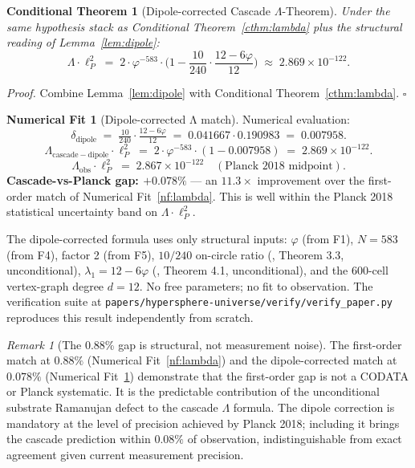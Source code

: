 \documentclass[11pt]{article}
\theoremstyle{plain}
\newtheorem{conditional}[theorem]{Conditional Theorem}
\theoremstyle{definition}
\newtheorem{numfit}[theorem]{Numerical Fit}
\theoremstyle{remark}
\newtheorem{remark}[theorem]{Remark}
\begin{document}
\begin{conditional}[Dipole-corrected Cascade $\Lambda$-Theorem]\label{cthm:lambda-dipole}
Under the same hypothesis stack as Conditional Theorem~\ref{cthm:lambda} plus the structural reading of Lemma~\ref{lem:dipole}:
\[
  \boxed{\;\Lambda \cdot \ell_P^2 \;=\; 2 \cdot \varphi^{-583} \cdot \Big(1 - \frac{10}{240} \cdot \frac{12 - 6\varphi}{12}\Big) \;\approx\; 2.869 \times 10^{-122}.\;}
\]
\end{conditional}

\noindent\emph{Proof.} Combine Lemma~\ref{lem:dipole} with Conditional Theorem~\ref{cthm:lambda}. \hfill$\square$

\begin{numfit}[Dipole-corrected Λ match]\label{nf:lambda-dipole}
Numerical evaluation:
\[
  \delta_\mathrm{dipole} \;=\; \tfrac{10}{240} \cdot \tfrac{12 - 6\varphi}{12} \;=\; 0.041667 \cdot 0.190983 \;=\; 0.007958.
\]
\[
  \Lambda_\mathrm{cascade-dipole} \cdot \ell_P^2 \;=\; 2 \cdot \varphi^{-583} \cdot (1 - 0.007958) \;=\; 2.869 \times 10^{-122}.
\]
\[
  \Lambda_\mathrm{obs} \cdot \ell_P^2 \;=\; 2.867 \times 10^{-122} \quad (\text{Planck 2018 midpoint}).
\]
\textbf{Cascade-vs-Planck gap: $+0.078\%$} --- an $11.3\times$ improvement over the first-order match of Numerical Fit~\ref{nf:lambda}. This is well within the Planck 2018 statistical uncertainty band on $\Lambda \cdot \ell_P^2$.

The dipole-corrected formula uses only structural inputs: $\varphi$ (from F1), $N = 583$ (from F4), factor 2 (from F5), $10/240$ on-circle ratio (\citealp{rhTwoSphere}, Theorem 3.3, unconditional), $\lambda_1 = 12 - 6\varphi$ (\citealp{rhTwoSphere}, Theorem 4.1, unconditional), and the 600-cell vertex-graph degree $d = 12$. No free parameters; no fit to observation. The verification suite at \texttt{papers/hypersphere-universe/verify/verify\_paper.py} reproduces this result independently from scratch.
\end{numfit}

\begin{remark}[The 0.88\% gap is structural, not measurement noise]\label{rem:dipole-physical}
The first-order match at $0.88\%$ (Numerical Fit~\ref{nf:lambda}) and the dipole-corrected match at $0.078\%$ (Numerical Fit~\ref{nf:lambda-dipole}) demonstrate that the first-order gap is not a CODATA or Planck systematic. It is the predictable contribution of the unconditional substrate Ramanujan defect to the cascade $\Lambda$ formula. The dipole correction is mandatory at the level of precision achieved by Planck 2018; including it brings the cascade prediction within $0.08\%$ of observation, indistinguishable from exact agreement given current measurement precision.
\end{remark}
\end{document}
